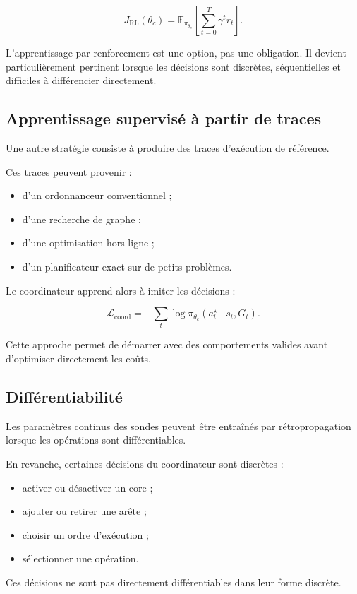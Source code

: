 \documentclass[11pt,a4paper]{article}
\begin{document}
\[
J_{\mathrm{RL}}(\theta_c)
=
\mathbb{E}_{\pi_{\theta_c}}
\left[
\sum_{t=0}^{T}\gamma^t r_t
\right].
\]

L'apprentissage par renforcement est une option, pas une obligation.
Il devient particulièrement pertinent lorsque les décisions sont
discrètes, séquentielles et difficiles à différencier directement.

\subsection{Apprentissage supervisé à partir de traces}

Une autre stratégie consiste à produire des traces d'exécution
de référence.

Ces traces peuvent provenir :
\begin{itemize}
  \item d'un ordonnanceur conventionnel ;
  \item d'une recherche de graphe ;
  \item d'une optimisation hors ligne ;
  \item d'un planificateur exact sur de petits problèmes.
\end{itemize}

Le coordinateur apprend alors à imiter les décisions :

\[
\mathcal{L}_{\mathrm{coord}}
=
-\sum_t
\log
\pi_{\theta_c}
(a_t^\star\mid s_t,G_t).
\]

Cette approche permet de démarrer avec des comportements valides
avant d'optimiser directement les coûts.

\subsection{Différentiabilité}

Les paramètres continus des sondes peuvent être entraînés par
rétropropagation lorsque les opérations sont différentiables.

En revanche, certaines décisions du coordinateur sont discrètes :
\begin{itemize}
  \item activer ou désactiver un core ;
  \item ajouter ou retirer une arête ;
  \item choisir un ordre d'exécution ;
  \item sélectionner une opération.
\end{itemize}

Ces décisions ne sont pas directement différentiables dans leur
forme discrète.
\end{document}
